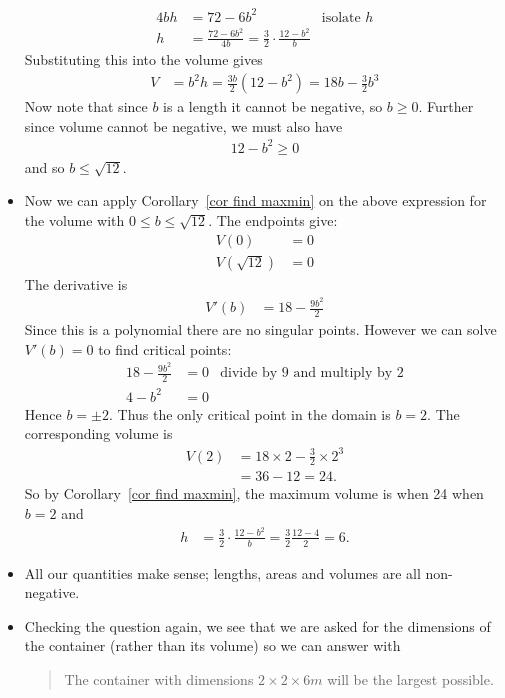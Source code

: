 \begin{eg}
\begin{itemize}
\begin{align*}
  4bh &= 72-6b^2  & \text{isolate $h$}\\
  h &= \frac{72-6b^2}{4b} = \frac{3}{2} \cdot \frac{12-b^2}{b}
\end{align*}
Substituting this into the volume gives
\begin{align*}
  V&= b^2 h = \frac{3b}{2} (12-b^2) = 18b - \frac{3}{2} b^3
\end{align*}
Now note that since $b$ is a length it cannot be negative, so $b \geq 0$. Further since
volume cannot be negative, we must also have
\begin{align*}
  12-b^2 \geq 0
\end{align*}
and so $b \leq \sqrt{12}$.

\item Now we can apply Corollary~\ref{cor find maxmin} on the above expression for
the volume with $0 \leq b \leq \sqrt{12}$. The endpoints give:
\begin{align*}
  V(0) &= 0 \\
  V(\sqrt{12}) &= 0
\end{align*}
The derivative is
\begin{align*}
  V'(b) &= 18 - \frac{9b^2}{2}
\end{align*}
Since this is a polynomial there are no singular points. However we can solve $V'(b) = 0$
to find critical points:
\begin{align*}
  18 - \frac{9b^2}{2} &= 0  & \text{divide by 9 and multiply by 2}\\
  4 - b^2 &= 0
\end{align*}
Hence $b = \pm 2$. Thus the only critical point in the domain is $b=2$. The corresponding
volume is
\begin{align*}
V(2) &= 18\times2 - \frac{3}{2} \times 2^3 \\
  &= 36 - 12 = 24.
\end{align*}
So by Corollary~\ref{cor find maxmin}, the maximum volume is when 24 when $b=2$ and
\begin{align*}
  h &= \frac{3}{2} \cdot \frac{12-b^2}{b} = \frac{3}{2} \frac{12-4}{2} = 6.
\end{align*}
\item All our quantities make sense; lengths, areas and volumes are all non-negative.
\item Checking the question again, we see that we are asked for the dimensions of the
container (rather than its volume) so we can answer with
\begin{quote}
 The container with dimensions $2 \times 2 \times 6m$ will be the largest possible.
\end{quote}
\end{itemize}
\end{eg}


